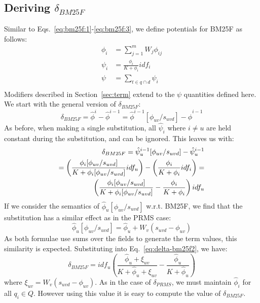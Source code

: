 \documentclass{sig-alternate}
\begin{document}
\subsection{Deriving $\delta_{BM25F}$}
Similar to Eqs.~\ref{eq:bm25f:1}-\ref{eq:bm25f:3}, we define potentials for BM25F as follows:
\begin{align*}
\phi_{i} 			&= \sum_{j=1}^{m} W_{j} \phi_{ij} \\
\psi_{i} 	&= \frac{\phi_{i}}{K + \phi_{i}} idf_{i} \\
\psi 		&= \sum_{t \in q \cap d} \psi_{i} \\
\end{align*}
Modifiers described in Section~\ref{sec:term} extend to the $\psi$ quantities defined here. We start with the general version of $\delta_{BM25F}$:
\begin{equation}
\delta_{BM25F} = {\hat \phi^{i}} - {\hat \phi^{i-1}} = {\hat \phi^{i-1}}[\phi_{uv}/s_{uvd}] - {\hat \phi^{i-1}}
\label{eq:delta-bm25f1}
\end{equation}
As before, when making a single substitution, all ${\hat \psi}_{i}$ where $i \neq u$ are held constant during the substitution, and can be ignored. This leaves us with:
\begin{align}
\delta_{BM25F} = {\hat \psi}^{i-1}_{u}[\phi_{uv}/s_{uvd}] - {\hat \psi}^{i-1}_{u} \notag \\ 
=  \left( \frac{\phi_{i}[\phi_{uv}/s_{uvd}]}{K + \phi_{i}[\phi_{uv}/s_{uvd}]} idf_{u} \right) - \left( \frac{\phi_{i}}{K + \phi_{i}} idf_{i} \right) = \notag \\
 \left( \frac{\phi_{i}[\phi_{uv}/s_{uvd}]}{K + \phi_{i}[\phi_{uv}/s_{uvd}]} - \frac{\phi_{i}}{K + \phi_{i}} \right) idf_{u}  \label{eq:delta-bm25f2}
\end{align}
If we consider the semantics of ${\hat \phi}_{u}[\phi_{uv}/s_{uvd}]$ w.r.t. BM25F, we find that the substitution has a similar effect as in the PRMS case:
\begin{equation*}
{\hat \phi}_{u}[\phi_{uv}/s_{uvd}] = {\hat \phi}_{u} + W_{v}(s_{uvd} - \phi_{uv})
\end{equation*}
As both formulae use sums over the fields to generate the term values, this similarity is expected. Substituting into Eq.~\ref{eq:delta-bm25f2}, we have:
\begin{equation*}
\delta_{BM25F} = idf_{u} \left( \frac{{\hat \phi}_{u} + \xi_{uv}}{K + {\hat \phi}_{u} + \xi_{uv}} -
\frac{{\hat \phi}_{u}}{K + {\hat \phi}_{u}} \right)
\end{equation*}
where $\xi_{uv} = W_{v}(s_{uvd} - \phi_{uv})$. As in the case of $\delta_{PRMS}$, we must maintain ${\hat \phi}_{i}$ for all $q_{i} \in Q$. However using this value it is easy to compute the value of $\delta_{BM25F}$.
\end{document}
